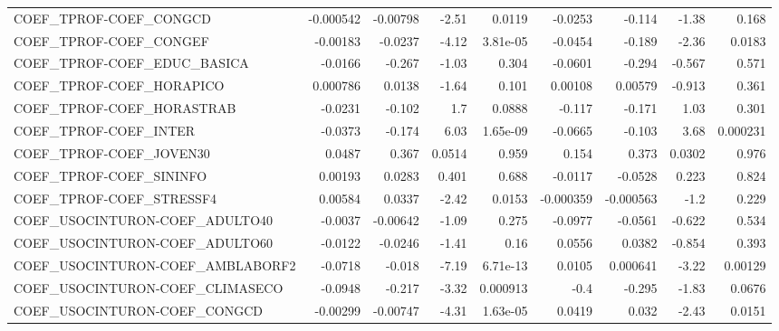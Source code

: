 \begin{tabular}{lrrrrrrrr}
COEF\_TPROF-COEF\_CONGCD                &   -0.000542 &     -0.00798 &    -2.51 &   0.0119 &    -0.0253 &      -0.114 &        -1.38 &         0.168 \\
COEF\_TPROF-COEF\_CONGEF                &    -0.00183 &      -0.0237 &    -4.12 & 3.81e-05 &    -0.0454 &      -0.189 &        -2.36 &        0.0183 \\
COEF\_TPROF-COEF\_EDUC\_BASICA           &     -0.0166 &       -0.267 &    -1.03 &    0.304 &    -0.0601 &      -0.294 &       -0.567 &         0.571 \\
COEF\_TPROF-COEF\_HORAPICO              &    0.000786 &       0.0138 &    -1.64 &    0.101 &    0.00108 &     0.00579 &       -0.913 &         0.361 \\
COEF\_TPROF-COEF\_HORASTRAB             &     -0.0231 &       -0.102 &      1.7 &   0.0888 &     -0.117 &      -0.171 &         1.03 &         0.301 \\
COEF\_TPROF-COEF\_INTER                 &     -0.0373 &       -0.174 &     6.03 & 1.65e-09 &    -0.0665 &      -0.103 &         3.68 &      0.000231 \\
COEF\_TPROF-COEF\_JOVEN30               &      0.0487 &        0.367 &   0.0514 &    0.959 &      0.154 &       0.373 &       0.0302 &         0.976 \\
COEF\_TPROF-COEF\_SININFO               &     0.00193 &       0.0283 &    0.401 &    0.688 &    -0.0117 &     -0.0528 &        0.223 &         0.824 \\
COEF\_TPROF-COEF\_STRESSF4              &     0.00584 &       0.0337 &    -2.42 &   0.0153 &  -0.000359 &   -0.000563 &         -1.2 &         0.229 \\
COEF\_USOCINTURON-COEF\_ADULTO40        &     -0.0037 &     -0.00642 &    -1.09 &    0.275 &    -0.0977 &     -0.0561 &       -0.622 &         0.534 \\
COEF\_USOCINTURON-COEF\_ADULTO60        &     -0.0122 &      -0.0246 &    -1.41 &     0.16 &     0.0556 &      0.0382 &       -0.854 &         0.393 \\
COEF\_USOCINTURON-COEF\_AMBLABORF2      &     -0.0718 &       -0.018 &    -7.19 & 6.71e-13 &     0.0105 &    0.000641 &        -3.22 &       0.00129 \\
COEF\_USOCINTURON-COEF\_CLIMASECO       &     -0.0948 &       -0.217 &    -3.32 & 0.000913 &       -0.4 &      -0.295 &        -1.83 &        0.0676 \\
COEF\_USOCINTURON-COEF\_CONGCD          &    -0.00299 &     -0.00747 &    -4.31 & 1.63e-05 &     0.0419 &       0.032 &        -2.43 &        0.0151 \\

\end{tabular}
